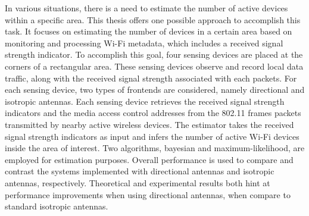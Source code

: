 \TAMUAbstractFormat

In various situations, there is a need to estimate the number of active devices within a specific area.
This thesis offers one possible approach to accomplish this task.
It focuses on estimating the number of devices in a certain area based on monitoring and processing Wi-Fi metadata, which includes a received signal strength indicator.
To accomplish this goal, four sensing devices are placed at the corners of a rectangular area.
These sensing devices observe and record local data traffic, along with the received signal strength associated with each packets.
For each sensing device, two types of frontends are considered, namely directional and isotropic antennas.
Each sensing device retrieves the received signal strength indicators and the media access control addresses from the 802.11 frames packets transmitted by nearby active wireless devices.
The estimator takes the received signal strength indicators as input and infers the number of active Wi-Fi devices inside the area of interest.
Two algorithms, bayesian and maximum-likelihood, are employed for estimation purposes.
Overall performance is used to compare and contrast the systems implemented with directional antennas and isotropic antennas, respectively.
Theoretical and experimental results both hint at performance improvements when using directional antennas, when compare to standard isotropic antennas.

